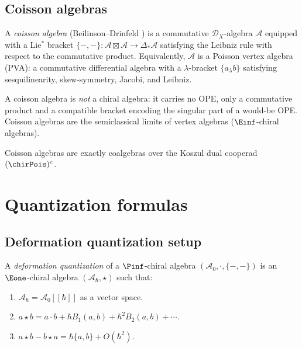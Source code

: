 \subsection{Coisson algebras}

\begin{definition}\label{def:coisson}
A \emph{coisson algebra} (Beilinson--Drinfeld \cite{BD04}) is a commutative
$\mathcal{D}_X$-algebra $\mathcal{A}$ equipped with a Lie$^*$ bracket
$\{-,-\}\colon \mathcal{A} \boxtimes \mathcal{A} \to \Delta_* \mathcal{A}$
satisfying the Leibniz rule with respect to the commutative product.
Equivalently, $\mathcal{A}$ is a Poisson vertex algebra (PVA): a commutative
differential algebra with a $\lambda$-bracket $\{a_\lambda b\}$ satisfying
sesquilinearity, skew-symmetry, Jacobi, and Leibniz.

A coisson algebra is \emph{not} a chiral algebra: it carries no OPE, only a
commutative product and a compatible bracket encoding the singular part of a
would-be OPE.  Coisson algebras are the semiclassical limits of vertex algebras
($\Einf$-chiral algebras).
\end{definition}


\begin{theorem}[Coisson = \texorpdfstring{$(\chirPois)^c$}{(chirPois)c}-coalgebra; \ClaimStatusProvedElsewhere{} \cite{BD04}]\label{thm:coisson-coalgebra}
Coisson algebras are exactly coalgebras over the Koszul dual cooperad $(\chirPois)^c$.
\end{theorem}


\section{Quantization formulas}
\label{sec:quantization-formulas}

\subsection{Deformation quantization setup}

\begin{construction}\label{constr:quantization}
A \emph{deformation quantization} of a $\Pinf$-chiral
algebra $(\mathcal{A}_0, \cdot, \{-,-\})$ is an
$\Eone$-chiral algebra $(\mathcal{A}_\hbar, \star)$ such
that:
\begin{enumerate}[label=(\roman*)]
\item $\mathcal{A}_\hbar = \mathcal{A}_0[[\hbar]]$ as a vector space.
\item $a \star b = a \cdot b + \hbar B_1(a, b) + \hbar^2 B_2(a, b) + \cdots$.
\item $a \star b - b \star a = \hbar \{a, b\} + O(\hbar^2)$.
\end{enumerate}
\end{construction}


